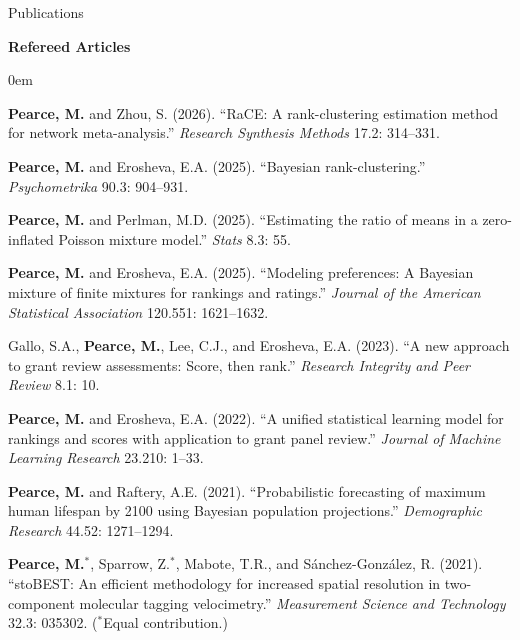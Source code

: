 \documentclass{resume} %
\begin{document}
\begin{rSection}{Publications}

\noindent \textbf{Refereed Articles}

\begin{etaremune}
\itemsep0em
\item \textbf{Pearce, M.} and Zhou, S. (2026). ``RaCE: A rank-clustering estimation method for network meta-analysis.'' \textit{Research Synthesis Methods} 17.2: 314--331.
\item \textbf{Pearce, M.} and Erosheva, E.A. (2025). ``Bayesian rank-clustering.'' \textit{Psychometrika} 90.3: 904--931.
\item \textbf{Pearce, M.} and Perlman, M.D. (2025). ``Estimating the ratio of means in a zero-inflated Poisson mixture model.'' \textit{Stats} 8.3: 55.
\item \textbf{Pearce, M.} and Erosheva, E.A. (2025). ``Modeling preferences: A Bayesian mixture of finite mixtures for rankings and ratings.'' \textit{Journal of the American Statistical Association} 120.551: 1621--1632.
\item Gallo, S.A., \textbf{Pearce, M.}, Lee, C.J., and Erosheva, E.A. (2023). ``A new approach to grant review assessments: Score, then rank.'' \textit{Research Integrity and Peer Review} 8.1: 10.
\item \textbf{Pearce, M.} and Erosheva, E.A. (2022). ``A unified statistical learning model for rankings and scores with application to grant panel review.'' \textit{Journal of Machine Learning Research} 23.210: 1--33.
\item \textbf{Pearce, M.} and Raftery, A.E. (2021). ``Probabilistic forecasting of maximum human lifespan by 2100 using Bayesian population projections.'' \textit{Demographic Research} 44.52: 1271--1294.
\item \textbf{Pearce, M.}$^*$, Sparrow, Z.$^*$, Mabote, T.R., and S\'anchez-Gonz\'alez, R. (2021). ``stoBEST: An efficient methodology for increased spatial resolution in two-component molecular tagging velocimetry.'' \textit{Measurement Science and Technology} 32.3: 035302. ($^*$Equal contribution.)
\end{etaremune}


\end{rSection}
\end{document}
